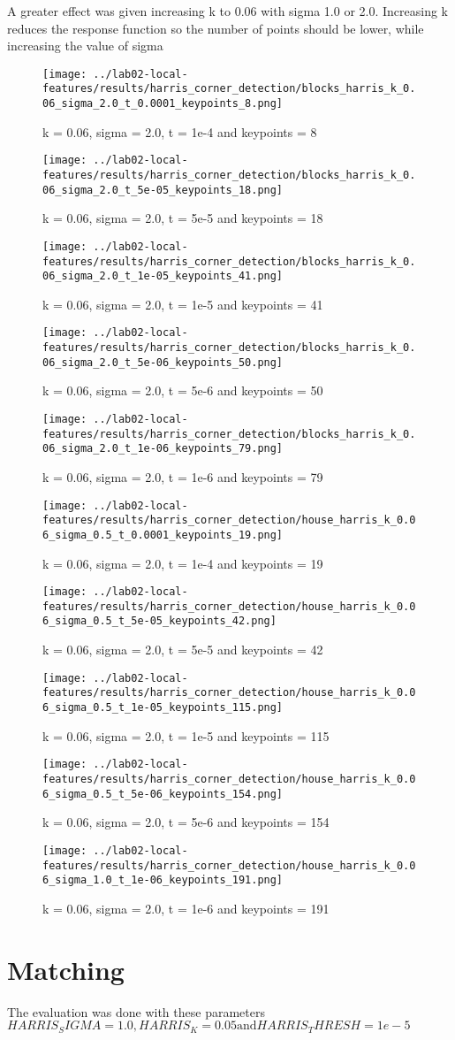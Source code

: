\documentclass{ETHExercise}
\begin{document}
A greater effect was given increasing k to 0.06 with sigma 1.0 or 2.0. Increasing k reduces the
response function so the number of points should be lower, while increasing the value of sigma

\begin{figure}
    \texttt{[image: ../lab02-local-features/results/harris\_corner\_detection/blocks\_harris\_k\_0.06\_sigma\_2.0\_t\_0.0001\_keypoints\_8.png]}
    \caption{k = 0.06, sigma = 2.0, t = 1e-4 and keypoints = 8}
  \endminipage\hfill
    \texttt{[image: ../lab02-local-features/results/harris\_corner\_detection/blocks\_harris\_k\_0.06\_sigma\_2.0\_t\_5e-05\_keypoints\_18.png]}
    \caption{k = 0.06, sigma = 2.0, t = 5e-5 and keypoints = 18}
  \endminipage\hfill
    \texttt{[image: ../lab02-local-features/results/harris\_corner\_detection/blocks\_harris\_k\_0.06\_sigma\_2.0\_t\_1e-05\_keypoints\_41.png]}
    \caption{k = 0.06, sigma = 2.0, t = 1e-5 and keypoints = 41}
  \endminipage\hfill
    \texttt{[image: ../lab02-local-features/results/harris\_corner\_detection/blocks\_harris\_k\_0.06\_sigma\_2.0\_t\_5e-06\_keypoints\_50.png]}
    \caption{k = 0.06, sigma = 2.0, t = 5e-6 and keypoints = 50}
  \endminipage\space\space\space 
    \texttt{[image: ../lab02-local-features/results/harris\_corner\_detection/blocks\_harris\_k\_0.06\_sigma\_2.0\_t\_1e-06\_keypoints\_79.png]}
    \caption{k = 0.06, sigma = 2.0, t = 1e-6 and keypoints = 79}
  \endminipage
\end{figure}
\begin{figure}
      \texttt{[image: ../lab02-local-features/results/harris\_corner\_detection/house\_harris\_k\_0.06\_sigma\_0.5\_t\_0.0001\_keypoints\_19.png]}
      \caption{k = 0.06, sigma = 2.0, t = 1e-4 and keypoints = 19}
    \endminipage\hfill
      \texttt{[image: ../lab02-local-features/results/harris\_corner\_detection/house\_harris\_k\_0.06\_sigma\_0.5\_t\_5e-05\_keypoints\_42.png]}
      \caption{k = 0.06, sigma = 2.0, t = 5e-5 and keypoints = 42}
    \endminipage\hfill
      \texttt{[image: ../lab02-local-features/results/harris\_corner\_detection/house\_harris\_k\_0.06\_sigma\_0.5\_t\_1e-05\_keypoints\_115.png]}
      \caption{k = 0.06, sigma = 2.0, t = 1e-5 and keypoints = 115}
    \endminipage\hfill
      \texttt{[image: ../lab02-local-features/results/harris\_corner\_detection/house\_harris\_k\_0.06\_sigma\_0.5\_t\_5e-06\_keypoints\_154.png]}
      \caption{k = 0.06, sigma = 2.0, t = 5e-6 and keypoints = 154}
    \endminipage\space\space\space 
      \texttt{[image: ../lab02-local-features/results/harris\_corner\_detection/house\_harris\_k\_0.06\_sigma\_1.0\_t\_1e-06\_keypoints\_191.png]}
      \caption{k = 0.06, sigma = 2.0, t = 1e-6 and keypoints = 191}
    \endminipage
  \end{figure}


\newpage
\section{Matching}

The evaluation was done with these parameters $HARRIS_SIGMA = 1.0, HARRIS_K = 0.05 \text{and} HARRIS_THRESH = 1e-5$
\end{document}
